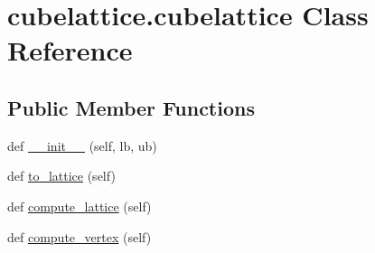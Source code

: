 \hypertarget{classcubelattice_1_1cubelattice}{}\section{cubelattice.\+cubelattice Class Reference}
\label{classcubelattice_1_1cubelattice}
\subsection*{Public Member Functions}
\begin{DoxyCompactItemize}
\item 
def \hyperlink{classcubelattice_1_1cubelattice_a877800444043a45c73c988fe0b057950}{\+\_\+\+\_\+init\+\_\+\+\_\+} (self, lb, ub)
\item 
def \hyperlink{classcubelattice_1_1cubelattice_af29b5923e02e375b796f4d175348473f}{to\+\_\+lattice} (self)
\item 
def \hyperlink{classcubelattice_1_1cubelattice_a8bc4766c57d45c810334d87ad78ca653}{compute\+\_\+lattice} (self)
\item 
def \hyperlink{classcubelattice_1_1cubelattice_aa93e98a034eb32f37711c461bfd5d7d5}{compute\+\_\+vertex} (self)
\end{DoxyCompactItemize}
